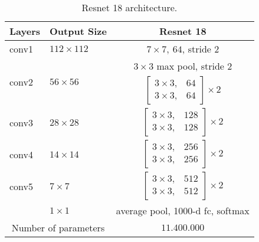 \begin{table}[H]
    \centering
    \begin{tabular}{|l|l|c|}
    \hline
    Layers                      & Output Size                     & Resnet 18                                                                     \\ \hline
    conv1                    & $112\times112$                  & $7 \times 7, \ 64$, stride 2                                                  \\ \hline
    \multirow{2}{*}{conv2} & \multirow{2}{*}{$56 \times 56$} & $3 \times 3$ max pool, stride 2                                               \\ \cline{3-3} 
                                &                                 & $\begin{bmatrix}3 \times 3 , & 64 \\ 3 \times 3,& 64 \end{bmatrix} \times 2$  \\ \hline
    conv3                  & $28 \times 28$                  & $\begin{bmatrix} 3\times 3, & 128 \\ 3\times 3, & 128 \end{bmatrix} \times 2$ \\ \hline
    conv4                  & $14 \times 14$                  & $\begin{bmatrix} 3\times 3, & 256\\ 3\times 3, & 256\end{bmatrix} \times 2$   \\ \hline
    conv5                  & $7 \times 7$                    & $\begin{bmatrix} 3\times 3, & 512\\ 3\times 3, & 512\end{bmatrix} \times 2$   \\ \hline
                                & $1\times 1 $                    & average pool, 1000-d fc, softmax                                              \\ \hline
    \multicolumn{2}{|c|}{Number of parameters}              & $11.400.000$                    \\ \hline

    \end{tabular}
    \caption{Resnet 18 architecture.}
    \label{arch:resnet:18}
    \end{table}

